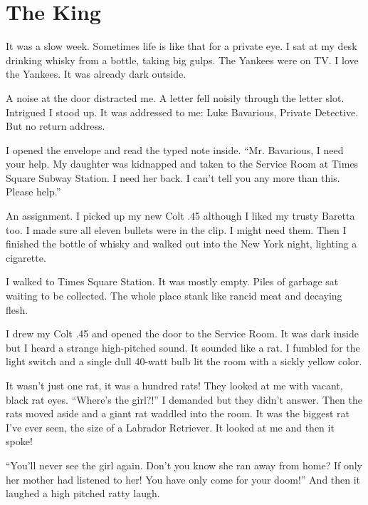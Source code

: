 \chapter{The King}





It was a slow week. Sometimes life is like that for a private eye.
I sat at my desk drinking whisky from a bottle, taking big gulps.
The Yankees were on TV. I love the Yankees. It was already dark
outside.



A noise at the door distracted me. A letter fell noisily through
the letter slot. Intrigued I stood up. It was addressed to me: Luke
Bavarious, Private Detective. But no return address.



I opened the envelope and read the typed note inside. ``Mr.
Bavarious, I need your help. My daughter was kidnapped and taken to
the Service Room at Times Square Subway Station. I need her back. I
can't tell you any more than this. Please help.''



An assignment. I picked up my new Colt .45 although I liked my
trusty Baretta too. I made sure all eleven bullets were in the
clip. I might need them. Then I finished the bottle of whisky and
walked out into the New York night, lighting a cigarette.



I walked to Times Square Station. It was mostly empty. Piles of
garbage sat waiting to be collected. The whole place stank like
rancid meat and decaying flesh.



I drew my Colt .45 and opened the door to the Service Room. It was
dark inside but I heard a strange high-pitched sound. It sounded
like a rat. I fumbled for the light switch and a single dull
40-watt bulb lit the room with a sickly yellow color.



It wasn't just one rat, it was a hundred rats! They looked at me
with vacant, black rat eyes. ``Where's the girl?!'' I demanded but
they didn't answer. Then the rats moved aside and a giant rat
waddled into the room. It was the biggest rat I've ever seen, the
size of a Labrador Retriever. It looked at me and then it
spoke!



``You'll never see the girl again. Don't you know she ran away from
home? If only her mother had listened to her! You have only come
for your doom!'' And then it laughed a high pitched ratty
laugh.



